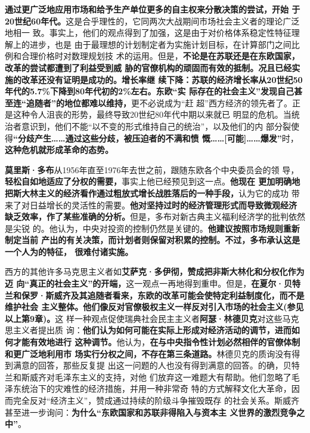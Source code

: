 \textbf{通过更广泛地应用市场和给予生产单位更多的自主权来分散决策的尝试，开始
  于20世纪60年代。}这是合乎理性的，它同两次大战期间市场社会主义者的理论广泛地相一
致。事实上，他们的观点得到了加强，这是由于对价格体系稳定性特征理解上的进步，也是
由于最理想的计划制定者为实施计划目标，在计算部门之间比例和合理价格时对数理规划技
术的运用。但是，\textbf{不论是在苏联还是在东欧国家，改革的尝试都遭到了利益受到威
  胁的官僚机构的顽固而有效的抵制。况且已经实施的改革还没有证明是成功的。增长率继
  续下降：苏联的经济增长率从20世纪50年代的5.7\%下降到80年代初的2\%左右。东欧“实
  际存在的社会主义”发现自己甚至连“追随者”的地位都难以维持，}更不必说成为“赶
超”西方经济的领先者了。正是这种令人沮丧的形势，最终导致20世纪80年代中期以来就已
明显的危机。当统治者意识到，他们不能“以不变的形式维持自己的统治”，以及他们的内
部分裂使得\textbf{“分歧产生……通过这些分歧，被压迫者的不满和愤
  慨……[可能]……爆发”}时，\textbf{这种危机就形成革命的态势。}

\textbf{莫里斯·多布}从1956年直至1976年去世之前，跟随东欧各个中央委员会的领
导，\textbf{轻松自如地适应了分权的需要，}事实上他已经预见到这一点。\textbf{他现在
  更加明确地把斯大林主义的经济看作通过粗放式增长战胜落后的一种手段，}认为它的成功
带来了对日益增长的灵活性的需要。\textbf{他对坚持过时的经济管理形式而导致微观经济
  缺乏效率，作了某些准确的分析。}但是，多布对新古典主义福利经济学的批判依然是尖锐
的。他认为，中央对投资的控制仍然是关键的。\textbf{他建议按照市场规则重新制定当前
  产出的有关决策，而计划者则保留对积累的控制。不过，多布承认这是一个人为的特征，
  很难付诸实施。}

西方的其他许多马克思主义者如\textbf{艾萨克·多伊彻，赞成把非斯大林化和分权化作为迈
  向“真正的社会主义”的开端，}这一观点一再地得到重申。但是，\textbf{在夏尔·贝特
  兰和保罗·斯威齐及其追随者看来，东欧的改革可能会使特定利益制度化，而不是维护社会
  主义整体。他们像反对官僚极权主义一样反对引入市场的社会主义(参见以上第9章)。}这
样一种观点促使瑞典社会民主主义者\textbf{阿瑟·林德贝克}对这些马克思主义者提出质
询：\textbf{他们认为如何可能在实际上形成对经济活动的调节，进而如何才能有效地进行
  这种调节。}他认为，\textbf{在与中央指令性计划必然相伴的官僚体制和更广泛地利用市
  场实行分权之间，不存在第三条道路。}林德贝克的质询没有得到满意的回答，那些反复提
出这一问题的人也没有得到满意的回答。的确，贝特兰和斯威齐对毛泽东主义的支持，对他
们放弃这一难题大有帮助。他们忽略了毛泽东统治下的灾难性的经济措施，并用一种非常奇
特的方式解释文化大革命，因而完全反对“经济主义”，赞成通过持续的阶级斗争摧毁既存
的社会关系。斯威齐甚至进一步询问：\textbf{为什么“东欧国家和苏联非得陷入与资本主
  义世界的激烈竞争之中”}。

